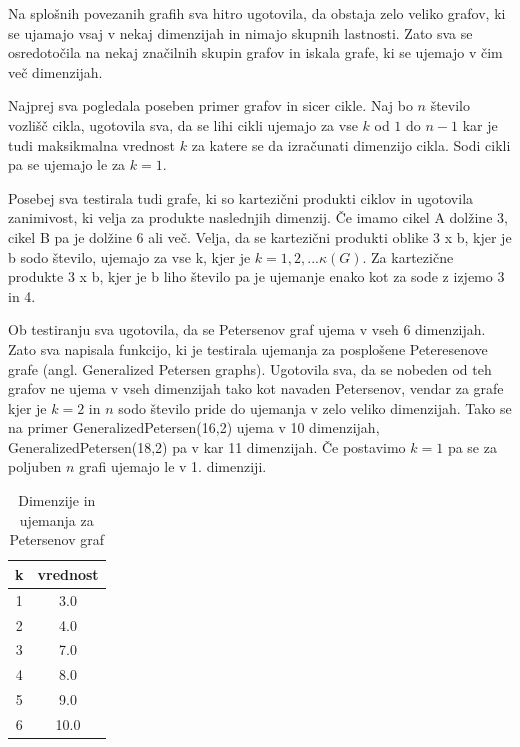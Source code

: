 \documentclass[12pt,a4paper]{amsart}
\theoremstyle{plain} %
\begin{document}
\bigskip

Na splošnih povezanih grafih sva hitro ugotovila, da obstaja zelo veliko grafov, ki se ujamajo vsaj v nekaj dimenzijah in nimajo skupnih lastnosti. Zato sva se osredotočila na nekaj značilnih skupin grafov in iskala grafe, ki se ujemajo v čim več dimenzijah.

Najprej sva pogledala poseben primer grafov in sicer cikle.
Naj bo $n$ število vozlišč cikla, ugotovila sva, da se lihi cikli ujemajo za vse $k$ od $1$ do $n - 1$ kar je tudi maksikmalna vrednost $k$ za katere se da izračunati dimenzijo cikla.
Sodi cikli pa se ujemajo le za $k = 1$. 

Posebej sva testirala tudi grafe, ki so kartezični produkti ciklov in ugotovila zanimivost, ki velja za produkte naslednjih dimenzij. Če imamo cikel A dolžine 3, cikel B 
pa je dolžine 6 ali več.
Velja, da se kartezični produkti oblike 3 x b, kjer je b sodo število, ujemajo za vse k, kjer je
$k = 1, 2, ... \kappa(G)$.
Za kartezične produkte 3 x b, kjer je b liho število pa je ujemanje enako kot za sode z izjemo 3 in 4.

\bigskip
Ob testiranju sva ugotovila, da se Petersenov graf ujema v vseh 6 dimenzijah. Zato sva napisala funkcijo, ki je testirala ujemanja za posplošene Peteresenove grafe (angl. Generalized Petersen graphs). Ugotovila sva, da se nobeden od teh grafov ne ujema v vseh dimenzijah tako kot navaden Petersenov, vendar za grafe kjer je $k=2$ in $n$ sodo število pride do ujemanja v zelo veliko dimenzijah. Tako se na primer GeneralizedPetersen(16,2) ujema v 10 dimenzijah, GeneralizedPetersen(18,2) pa v kar 11 dimenzijah. Če postavimo $k=1$ pa se za poljuben $n$ grafi ujemajo le v 1. dimenziji.  

\begin{table}[h]
    \centering
    \begin{tabular}{|c|c|}
        \hline
        k & vrednost \\
        \hline
        1 & 3.0 \\
        2 & 4.0 \\
        3 & 7.0 \\
        4 & 8.0 \\
        5 & 9.0 \\
        6 & 10.0 \\
        \hline
    \end{tabular}
    \caption{Dimenzije in ujemanja za Petersenov graf}
    \label{tab:python_output}
\end{table}
\end{document}
